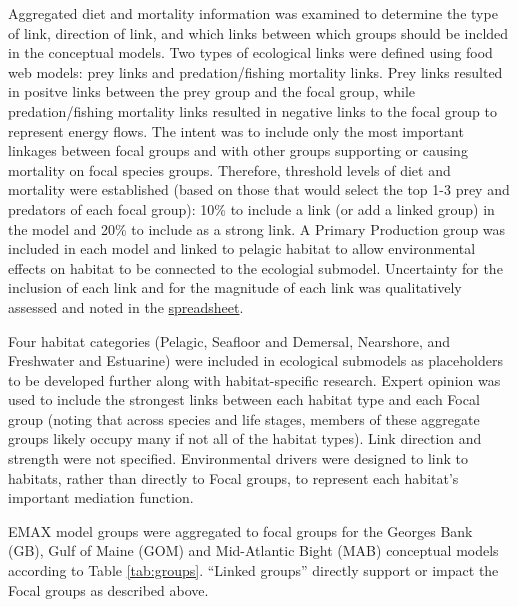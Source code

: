 \documentclass[
]{book}
\begin{document}
Aggregated diet and mortality information was examined to determine the type of link, direction of link, and which links between which groups should be inclded in the conceptual models. Two types of ecological links were defined using food web models: prey links and predation/fishing mortality links. Prey links resulted in positve links between the prey group and the focal group, while predation/fishing mortality links resulted in negative links to the focal group to represent energy flows. The intent was to include only the most important linkages between focal groups and with other groups supporting or causing mortality on focal species groups. Therefore, threshold levels of diet and mortality were established (based on those that would select the top 1-3 prey and predators of each focal group): 10\% to include a link (or add a linked group) in the model and 20\% to include as a strong link. A Primary Production group was included in each model and linked to pelagic habitat to allow environmental effects on habitat to be connected to the ecologial submodel. Uncertainty for the inclusion of each link and for the magnitude of each link was qualitatively assessed and noted in the \href{https://comet.nefsc.noaa.gov/erddap/tabledap/concept_model_2018.html}{spreadsheet}.

Four habitat categories (Pelagic, Seafloor and Demersal, Nearshore, and Freshwater and Estuarine) were included in ecological submodels as placeholders to be developed further along with habitat-specific research. Expert opinion was used to include the strongest links between each habitat type and each Focal group (noting that across species and life stages, members of these aggregate groups likely occupy many if not all of the habitat types). Link direction and strength were not specified. Environmental drivers were designed to link to habitats, rather than directly to Focal groups, to represent each habitat's important mediation function.

EMAX model groups were aggregated to focal groups for the Georges Bank (GB), Gulf of Maine (GOM) and Mid-Atlantic Bight (MAB) conceptual models according to Table \ref{tab:groups}. ``Linked groups'' directly support or impact the Focal groups as described above.
\end{document}
